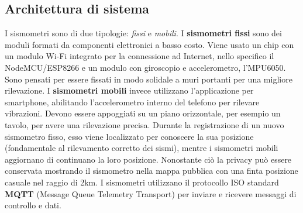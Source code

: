 \documentclass[a4paper,10pt]{memoir}
\begin{document}
\subsection{Architettura di sistema}
I sismometri sono di due tipologie: \textit{fissi} e \textit{mobili}.
I \textbf{sismometri fissi} sono dei moduli formati da componenti elettronici a basso costo. Viene usato un chip con un modulo Wi-Fi integrato per la connessione ad Internet, nello specifico il NodeMCU/ESP8266 e un modulo con giroscopio e accelerometro, l'MPU6050.
Sono pensati per essere fissati in modo solidale a muri portanti per una migliore rilevazione.
I \textbf{sismometri mobili} invece utilizzano l'applicazione per smartphone, abilitando l'accelerometro interno del telefono per rilevare vibrazioni.
Devono essere appoggiati su un piano orizzontale, per esempio un tavolo, per avere una rilevazione precisa.
Durante la registrazione di un nuovo sismometro fisso, esso viene localizzato per conoscere la sua posizione (fondamentale al rilevamento corretto dei sismi), mentre i sismometri mobili aggiornano di continuano la loro posizione. Nonostante ciò la privacy può essere conservata mostrando il sismometro nella mappa pubblica con una finta posizione casuale nel raggio di 2km.
I sismometri utilizzano il protocollo ISO standard \textbf{MQTT} (Message Queue Telemetry Transport) per inviare e ricevere messaggi di controllo e dati.
\end{document}
